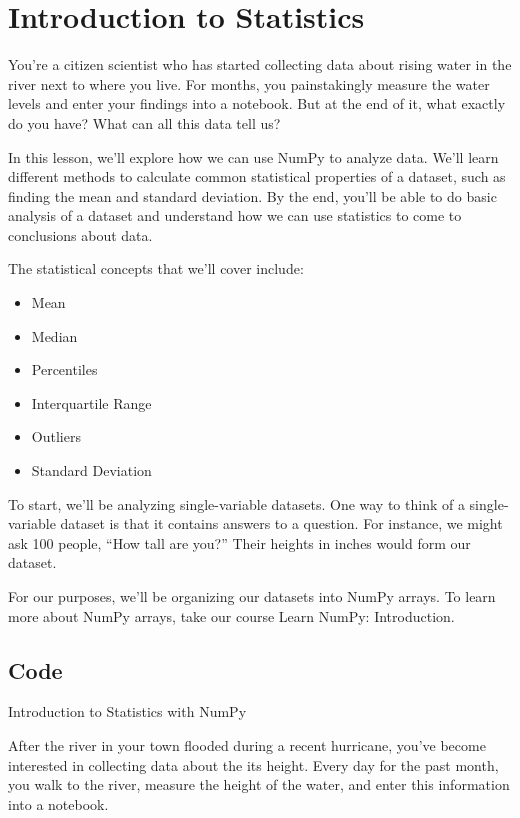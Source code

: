 \documentclass{journal}
\begin{document}
\section{Introduction to Statistics}
You're a citizen scientist who has started collecting data about rising water in the river next to where you live. For months, you painstakingly measure the water levels and enter your findings into a notebook. But at the end of it, what exactly do you have? What can all this data tell us?

In this lesson, we'll explore how we can use NumPy to analyze data. We'll learn different methods to calculate common statistical properties of a dataset, such as finding the mean and standard deviation. By the end, you'll be able to do basic analysis of a dataset and understand how we can use statistics to come to conclusions about data.

The statistical concepts that we'll cover include:

\begin{itemize}
	\item Mean
	\item Median
	\item Percentiles
	\item Interquartile Range
	\item Outliers
	\item Standard Deviation
	
\end{itemize}

To start, we'll be analyzing single-variable datasets. One way to think of a single-variable dataset is that it contains answers to a question. For instance, we might ask 100 people, “How tall are you?” Their heights in inches would form our dataset.

For our purposes, we'll be organizing our datasets into NumPy arrays. To learn more about NumPy arrays, take our course Learn NumPy: Introduction.

\subsection{Code}

Introduction to Statistics with NumPy

After the river in your town flooded during a recent hurricane, you've become interested in collecting data about the its height. Every day for the past month, you walk to the river, measure the height of the water, and enter this information into a notebook.
\end{document}
